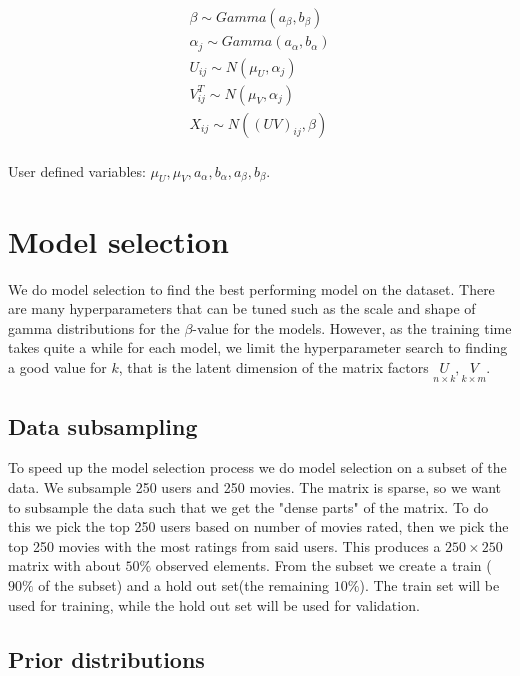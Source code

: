\documentclass[12pt]{article}
\begin{document}
    \begin{align*}
        \beta \sim Gamma(a_\beta, b_\beta) \\
        \alpha_{j} \sim Gamma(a_\alpha, b_\alpha) \\
        U_{ij} \sim N(\mu_U, \alpha_j) \\
        V^T_{ij} \sim N(\mu_V, \alpha_j) \\
        X_{ij}\sim N((UV)_{ij}, \beta) \\
    \end{align*}

    User defined variables: $\mu_U, \mu_V, a_\alpha, b_\alpha, a_\beta, b_\beta$.

\section{Model selection}
We do model selection to find the best performing model on the dataset. There are many hyperparameters that can be tuned such as the scale and shape of gamma distributions for the $\beta$-value for the models. However, as the training time takes quite a while for each model, we limit the hyperparameter search to finding a good value for $k$, that is the latent dimension of the matrix factors $\underset{n \times k}{U}, \underset{k \times m}{V}$. 

    \subsection{Data subsampling}
    To speed up the model selection process we do model selection on a subset of the data. We subsample 250 users and 250 movies. The matrix is sparse, so we want to subsample the data such that we get the "dense parts" of the matrix. To do this we pick the top 250 users based on number of movies rated, then we pick the top 250 movies with the most ratings from said users. This produces a $250 \times 250$ matrix with about $50\%$ observed elements. From the subset we create a train ($90\%$ of the subset) and a hold out set(the remaining $10\%$). The train set will be used for training, while the hold out set will be used for validation.

    \subsection{Prior distributions}
\end{document}
